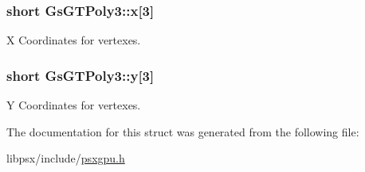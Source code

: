 \subsubsection[{x}]{\setlength{\rightskip}{0pt plus 5cm}short Gs\+G\+T\+Poly3\+::x\mbox{[}3\mbox{]}}\label{structGsGTPoly3_ae3714403a39ee1e80b370b998ec83b29}


X Coordinates for vertexes. 

\hypertarget{structGsGTPoly3_ab314ec9af8c175188d644ff048df69d1}{}
\subsubsection[{y}]{\setlength{\rightskip}{0pt plus 5cm}short Gs\+G\+T\+Poly3\+::y\mbox{[}3\mbox{]}}\label{structGsGTPoly3_ab314ec9af8c175188d644ff048df69d1}


Y Coordinates for vertexes. 



The documentation for this struct was generated from the following file\+:\begin{DoxyCompactItemize}
\item 
libpsx/include/\hyperlink{psxgpu_8h}{psxgpu.\+h}\end{DoxyCompactItemize}

